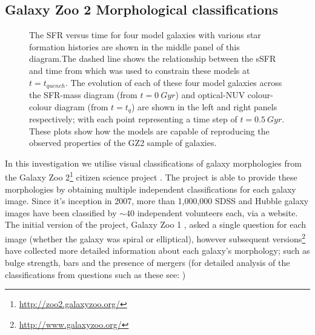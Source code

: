\documentclass{mn2e}
\begin{document}
\subsection{Galaxy Zoo 2 Morphological classifications}\label{class}

\begin{figure}
\caption{The SFR versus time for four model galaxies with various star formation histories are shown in the middle panel of this diagram.The dashed line shows the relationship between the sSFR and time from \citet{Peng} which was used to constrain these models at $t=t_{quench}$. The evolution of each of these four model galaxies across the SFR-mass diagram (from $t=0~Gyr$) and optical-NUV colour-colour diagram (from $t=t_q$) are shown in the left and right panels respectively; with each point representing a time step of $t=0.5~Gyr$. These plots show how the models are capable of reproducing the observed properties of the GZ2 sample of galaxies.}
\label{sfr_mass_col}
\end{figure}

In this investigation we utilise visual classifications of galaxy morphologies from the Galaxy Zoo 2\footnote{\url{http://zoo2.galaxyzoo.org/}} citizen science project \citep{GZ2}. The project is able to provide these morphologies by obtaining multiple independent classifications for each galaxy image. Since it's inception in 2007, more than 1,000,000 SDSS and Hubble galaxy images have been classified by $\sim 40$ independent volunteers each, via a website. The initial version of the project, Galaxy Zoo 1 \citep{Lintott09, Lintott11}, asked a single question for each image (whether the galaxy was spiral or elliptical), however subsequent versions\footnote{\url{http://www.galaxyzoo.org/}} have collected more detailed information about each galaxy's morphology; such as bulge strength, bars and the presence of mergers (for detailed analysis of the classifications from questions such as these see: \citealt{Darg, Sch09, Masters11, Masters12, Simmons13, Cheung13, Melvin14})
\end{document}
